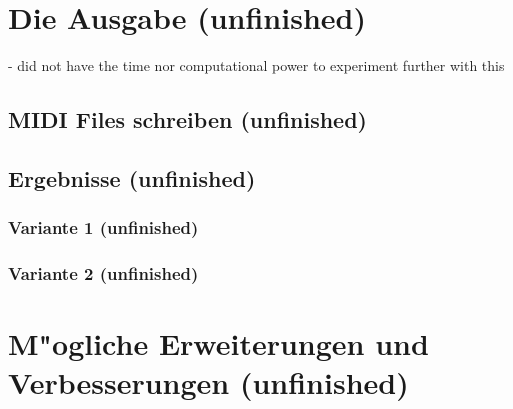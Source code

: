 {\section{Die Ausgabe (unfinished)}
- did not have the time nor computational power to experiment further with this
\subsection{MIDI Files schreiben (unfinished)}
\subsection{Ergebnisse (unfinished)}
\subsubsection{Variante 1 (unfinished)}
\subsubsection{Variante 2 (unfinished)}

\section{M"ogliche Erweiterungen und Verbesserungen (unfinished)}

} %